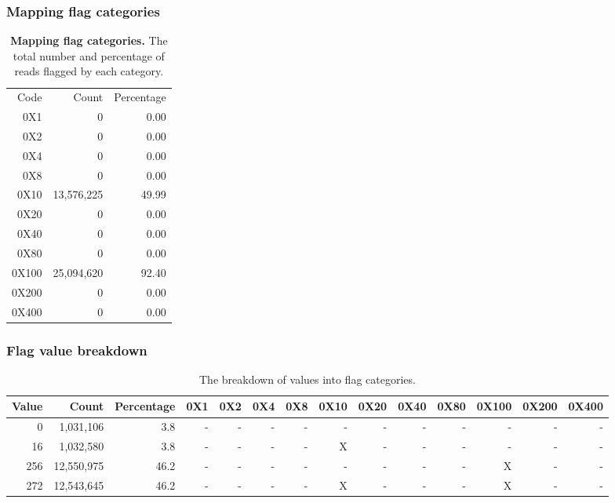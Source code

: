 \documentclass{article}
\begin{document}
\subsubsection{Mapping flag categories}
\begin{table}
\begin{tabular}{|r|r|r|}
  \hline
Code & Count & Percentage \\ 
  \rowcolor[gray]{0.9} \hline
0X1 &          0 &  0.00 \\ 
  0X2 &          0 &  0.00 \\ 
   \rowcolor[gray]{0.9}0X4 &          0 &  0.00 \\ 
  0X8 &          0 &  0.00 \\ 
   \rowcolor[gray]{0.9}0X10 & 13,576,225 & 49.99 \\ 
  0X20 &          0 &  0.00 \\ 
   \rowcolor[gray]{0.9}0X40 &          0 &  0.00 \\ 
  0X80 &          0 &  0.00 \\ 
   \rowcolor[gray]{0.9}0X100 & 25,094,620 & 92.40 \\ 
  0X200 &          0 &  0.00 \\ 
   \rowcolor[gray]{0.9}0X400 &          0 &  0.00 \\ 
   \hline
\end{tabular}\caption{\textbf{Mapping flag categories.} The total number and percentage of reads flagged by each category.}
\end{table}

\subsubsection{Flag value breakdown}
\begin{center}
{\tiny
\begin{longtable}{|r|r|r|r|r|r|r|r|r|r|r|r|r|r|}
\caption{The breakdown of values into flag categories.} \\ 
  \hline
Value & Count & Percentage & 0X1 & 0X2 & 0X4 & 0X8 & 0X10 & 0X20 & 0X40 & 0X80 & 0X100 & 0X200 & 0X400 \\ 
  \hline
0 &  1,031,106 &  3.8 & - & - & - & - & - & - & - & - & - & - & - \\ 
   \rowcolor[gray]{0.9}16 &  1,032,580 &  3.8 & - & - & - & - & X & - & - & - & - & - & - \\ 
  256 & 12,550,975 & 46.2 & - & - & - & - & - & - & - & - & X & - & - \\ 
   \rowcolor[gray]{0.9}272 & 12,543,645 & 46.2 & - & - & - & - & X & - & - & - & X & - & - \\ 
   \hline
\hline
\end{longtable}
}\end{center}
\end{document}
